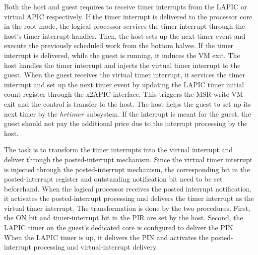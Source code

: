 Both the host and guest requires to receive timer interrupts
from the LAPIC or virtual APIC respectively. If the timer
interrupt is delivered to the processor core in the root mode,
the logical processor services the timer interrupt through the
host's timer interrupt handler. Then, the host sets up the
next timer event and execute the previously scheduled work
from the bottom halves. If the timer interrupt is delivered,
while the guest is running, it induces the VM exit. The host
handles the timer interrupt and injects the virtual timer
interrupt to the guest. When the guest receives the virtual
timer interrupt, it services the timer interrupt and set up
the next timer event by updating the LAPIC timer initial count
register through the x2APIC interface. This triggers the
MSR-write VM exit and the control is transfer to the host. The
host helps the guest to set up its next timer by the $hrtimer$
subsystem. If the interrupt is meant for the guest, the guest
should not pay the additional price due to the interrupt
processing by the host.

The task is to transform the timer interrupts into the virtual
interrupt and deliver through the posted-interrupt mechanism.
Since the virtual timer interrupt is injected through the
posted-interrupt mechanism, the corresponding bit in the
posted-interrupt register and outstanding notification bit
need to be set beforehand. When the logical processor receives
the posted interrupt notification, it activates the
posted-interrupt processing and delivers the timer interrupt
as the virtual timer interrupt. The transformation is done by
the two procedures. First, the ON bit and timer-interrupt bit
in the PIR are set by the host. Second, the LAPIC timer on the
guest's dedicated core is configured to deliver the PIN. When
the LAPIC timer is up, it delivers the PIN and activates the
posted-interrupt processing and virtual-interrupt delivery.
